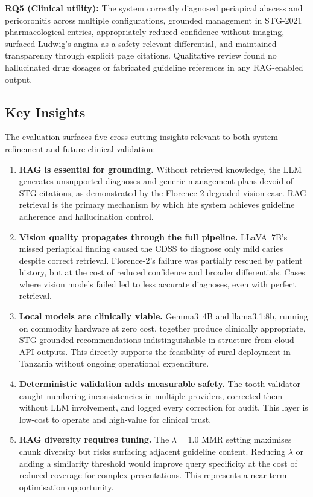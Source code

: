\documentclass[12pt,a4paper]{report}
\begin{document}
	\textbf{RQ5 (Clinical utility):} The system correctly diagnosed periapical
	abscess and pericoronitis across multiple configurations, grounded management
	in STG-2021 pharmacological entries, appropriately reduced confidence without
	imaging, surfaced Ludwig's angina as a safety-relevant differential, and
	maintained transparency through explicit page citations. Qualitative review found
	no hallucinated drug dosages or fabricated guideline references in any RAG-enabled
	output.
	
	\subsection{Key Insights}
	
	The evaluation surfaces five cross-cutting insights relevant to both system
	refinement and future clinical validation:
	
	\begin{enumerate}
		
		\item \textbf{RAG is essential for grounding.} Without retrieved knowledge, the
		LLM generates unsupported diagnoses and generic management plans devoid of STG
		citations, as demonstrated by the Florence-2 degraded-vision case. RAG retrieval
		is the primary mechanism by which hte system achieves guideline adherence and
		hallucination control.
		
		\item \textbf{Vision quality propagates through the full pipeline.} LLaVA~7B's
		missed periapical finding caused the CDSS to diagnose only mild caries despite
		correct retrieval. Florence-2's failure was partially rescued by patient history,
		but at the cost of reduced confidence and broader differentials. Cases where vision models failed led to less accurate diagnoses, even with perfect retrieval.
		
		\item \textbf{Local models are clinically viable.} Gemma3~4B and llama3.1:8b,
		running on commodity hardware at zero cost, together produce clinically
		appropriate, STG-grounded recommendations indistinguishable in structure from
		cloud-API outputs. This directly supports the feasibility of rural deployment
		in Tanzania without ongoing operational expenditure.
		
		\item \textbf{Deterministic validation adds measurable safety.} The tooth
		validator caught numbering inconsistencies in multiple providers, corrected
		them without LLM involvement, and logged every correction for audit.
		This layer is low-cost to operate and high-value for clinical trust.
		
		\item \textbf{RAG diversity requires tuning.} The $\lambda{=}1.0$ MMR setting
		maximises chunk diversity but risks surfacing adjacent guideline content.
		Reducing $\lambda$ or adding a similarity threshold would improve query
		specificity at the cost of reduced coverage for complex presentations.
		This represents a near-term optimisation opportunity.
		
	\end{enumerate}
	
\end{document}
